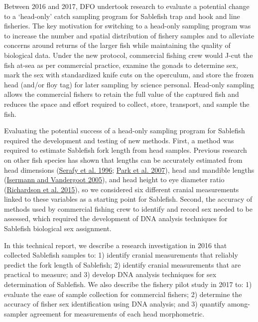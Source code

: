 \documentclass[12pt]{article}\usepackage[]{graphicx}\usepackage[]{color}
\begin{document}
Between 2016 and 2017, DFO undertook research to evaluate a potential change to a `head-only' catch sampling program for Sablefish trap and hook and line fisheries. The key motivation for switching to a head-only sampling program was to increase the number and spatial distribution of fishery samples and to alleviate concerns around returns of the larger fish while maintaining the quality of biological data. Under the new protocol, commercial fishing crew would J-cut the fish at-sea as per commercial practice, examine the gonads to determine sex, mark the sex with standardized knife cuts on the operculum, and store the frozen head (and/or floy tag) for later sampling by science personal. Head-only sampling allows the commercial fishers to retain the full value of the captured fish and reduces the space and effort required to collect, store, transport, and sample the fish.

Evaluating the potential success of a head-only sampling program for Sablefish required the development and testing of new methods. First, a method was required to estimate Sablefish fork length from head samples. Previous research on other fish species has shown that lengths can be accurately estimated from head dimensions (\protect\hyperlink{ref-Serafy1996}{Serafy et al. 1996}; \protect\hyperlink{ref-Park2007}{Park et al. 2007}), head and mandible lengths (\protect\hyperlink{ref-Isermann2005}{Isermann and Vandergoot 2005}), and head height to eye diameter ratio (\protect\hyperlink{ref-Richardson2015}{Richardson et al. 2015}), so we considered six different cranial measurements linked to these variables as a starting point for Sablefish. Second, the accuracy of methods used by commercial fishing crew to identify and record sex needed to be assessed, which required the development of DNA analysis techniques for Sablefish biological sex assignment.

In this technical report, we describe a research investigation in 2016 that collected Sablefish samples to: 1) identify cranial measurements that reliably predict the fork length of Sablefish; 2) identify cranial measurements that are practical to measure; and 3) develop DNA analysis techniques for sex determination of Sablefish. We also describe the fishery pilot study in 2017 to: 1) evaluate the ease of sample collection for commercial fishers; 2) determine the accuracy of fisher sex identification using DNA analysis; and 3) quantify among-sampler agreement for measurements of each head morphometric.

\clearpage
\end{document}
